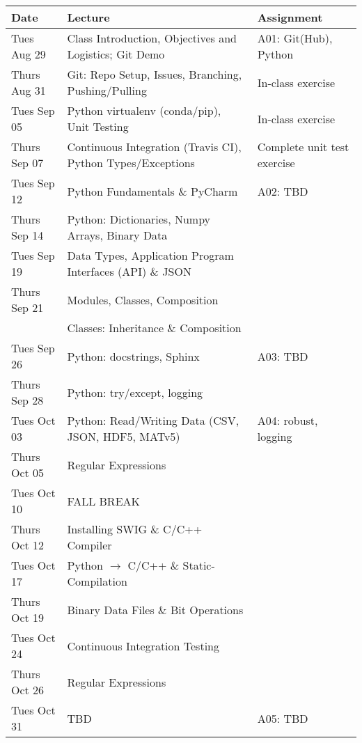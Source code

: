 \begin{longtable}[c]{|l|l|l|}

    \hline 
    
    \textbf{Date} & \textbf{Lecture} & \textbf{Assignment}\\

    \hline

    Tues Aug 29     & Class Introduction, Objectives and Logistics; Git Demo & A01: Git(Hub), Python\\
    Thurs Aug 31    & Git: Repo Setup, Issues, Branching, Pushing/Pulling & In-class exercise\\
    \hline
    Tues Sep 05     & Python virtualenv (conda/pip), Unit Testing & In-class exercise\\
    Thurs Sep 07    & Continuous Integration (Travis CI), Python Types/Exceptions & Complete unit test exercise\\
    \hline
    Tues Sep 12     & Python Fundamentals \& PyCharm & A02: TBD \\
    Thurs Sep 14    & Python: Dictionaries, Numpy Arrays, Binary Data & \\
    \hline
    Tues Sep 19     & Data Types, Application Program Interfaces (API) \& JSON & \\
    Thurs Sep 21    & Modules, Classes, Composition& \\
                    & Classes: Inheritance \& Composition & \\
    \hline
    Tues Sep 26     & Python: docstrings, Sphinx & A03: TBD\\
    Thurs Sep 28    & Python: try/except, logging & \\
    \hline
    Tues Oct 03     & Python: Read/Writing Data (CSV, JSON, HDF5, MATv5) & A04: robust, logging \\
    Thurs Oct 05    & Regular Expressions & \\
    \hline
    Tues Oct 10     & FALL BREAK & \\
    Thurs Oct 12    & Installing SWIG \& C/C++ Compiler & \\
    \hline
    Tues Oct 17     & Python $\rightarrow$ C/C++ \& Static-Compilation & \\
    Thurs Oct 19    & Binary Data Files \& Bit Operations & \\
    \hline
    Tues Oct 24     & Continuous Integration Testing & \\
    Thurs Oct 26    & Regular Expressions & \\
    \hline
    Tues Oct 31     & TBD & A05: TBD \\

\end{longtable}

